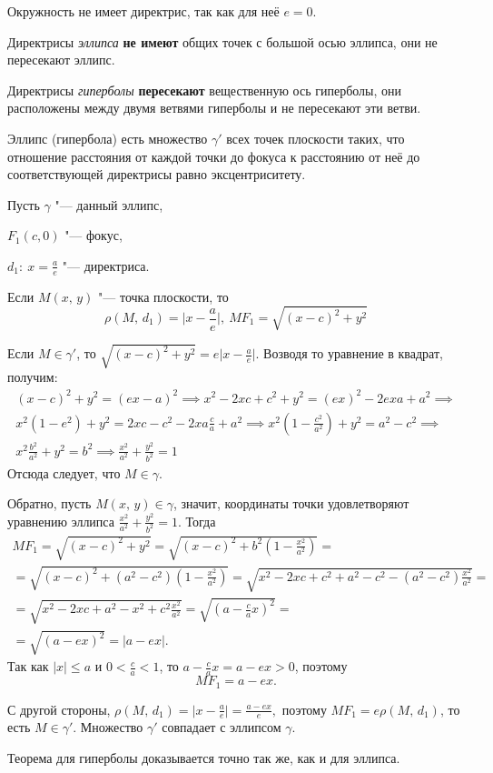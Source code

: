 Окружность не имеет директрис, так как для неё $e = 0$.

Директрисы \textit{эллипса} \textbf{не имеют} общих точек с большой осью эллипса,
они не пересекают эллипс.

Директрисы \textit{гиперболы} \textbf{пересекают} вещественную ось гиперболы, они
расположены между двумя ветвями гиперболы и не пересекают эти ветви.

\begin{theorem}
  Эллипс (гипербола) есть множество $\gamma'$
  всех точек плоскости таких, что отношение расстояния от каждой точки до фокуса к
  расстоянию от неё до соответствующей директрисы равно эксцентриситету.
\end{theorem}

\begin{Proof}
  Пусть $\gamma$ "--- данный эллипс, 
  
  $F_1(c, 0)$ "--- фокус, 
  
  $d_1: ~  x = \frac{a}{e}$ "--- директриса.

  Если $M(x, \, y)$ "--- точка плоскости, то
  $$
     \rho  (M, \, d_1) = \mathopen|x - \frac{a}{e}\mathclose|, ~ MF_1  = \sqrt{(x - c)^2 + y^2}
  $$

  Если $M \in \gamma'$, то $\sqrt{(x - c)^2 + y^2} = e \mathopen|x - \frac{a}{e}\mathclose|$. Возводя то уравнение в квадрат, получим:
  \begin{gather*} 
    (x - c)^2 + y^2 = (ex - a)^2 \implies x^2 - 2xc + c^2 + y^2 = (ex)^2 - 2exa + a^2 \implies \\
    x^2(1 - e^2) + y^2 = 2xc - c^2 - 2xa \frac{c}{a} + a^2 \implies x^2 (1 - \frac{c^2}{a^2}) + y^2 = a^2 - c^2 \implies \\
    x^2 \frac{b^2}{a^2} + y^2 = b^2 \implies \frac{x^2}{a^2} + \frac{y^2}{b^2} = 1
  \end{gather*}
  Отсюда следует, что $M \in \gamma$.

  Обратно, пусть $M(x, \, y) \in \gamma$, значит, координаты точки удовлетворяют уравнению эллипса $\frac{x^2}{a^2} + \frac{y^2}{b^2} = 1$. Тогда
  \begin{gather*}
    MF_1 = \sqrt{(x - c)^2 + y^2} = \sqrt{(x - c)^2 + b^2 (1 - \frac{x^2}{a^2})} = \\
    = \sqrt{(x - c)^2 + (a^2 - c^2)(1 - \frac{x^2}{a^2})} = \sqrt{x^2 - 2xc + c^2 + a^2 - c^2 - (a^2 - c^2)\frac{x^2}{a^2}} = \\
    = \sqrt{x^2 - 2xc + a^2 - x^2 + c^2 \frac{x^2}{a^2}} = \sqrt{(a - \frac{c}{a}x)^2} = \\
    = \sqrt{(a - ex)^2} = \mathopen|a - ex\mathclose|.
  \end{gather*}
  Так как $\mathopen|x\mathclose| \leq a$ и $0 < \frac{c}{a} < 1$, то $a - \frac{c}{a}x = a - ex > 0$, поэтому
  $$
    MF_1 = a - ex.
  $$

  С другой стороны, $\rho (M, \, d_1) = \mathopen|x - \frac{a}{e}\mathclose| = \frac{a - ex}{e},$ поэтому $MF_1 = e\rho(M, \, d_1)$, то есть $M \in \gamma'$. Множество $\gamma'$ совпадает с эллипсом $\gamma$.
  
  Теорема для гиперболы доказывается точно так же, как и для эллипса.
\end{Proof}

